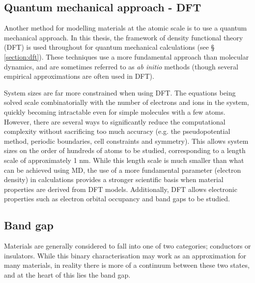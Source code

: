 

\subsection{Quantum mechanical approach - DFT}

Another method for modelling materials at the atomic scale is to use a quantum mechanical approach. In this thesis, the framework of density functional theory (DFT) is used throughout for quantum mechanical calculations (see § \ref{section:dft}). These techniques use a more fundamental approach than molecular dynamics, and are sometimes referred to as \emph{ab initio} methods (though several empirical approximations are often used in DFT).  

System sizes are far more constrained when using DFT. The equations being solved scale combinatorially with the number of electrons and ions in the system, quickly becoming intractable even for simple molecules with a few atoms. However, there are several ways to significantly reduce the computational complexity without sacrificing too much accuracy (e.g. the pseudopotential method, periodic boundaries, cell constraints and symmetry). This allows system sizes on the order of hundreds of atoms to be studied, corresponding to a length scale of approximately 1 nm. While this length scale is much smaller than what can be achieved using MD, the use of a more fundamental parameter (electron density) in calculations provides a stronger scientific basis when material properties are derived from DFT models. Additionally, DFT allows electronic properties such as electron orbital occupancy and band gaps to be studied.

\subsection{Band gap}

Materials are generally considered to fall into one of two categories; conductors or insulators. While this binary characterisation may work as an approximation for many materials, in reality there is more of a continuum between these two states, and at the heart of this lies the band gap.

